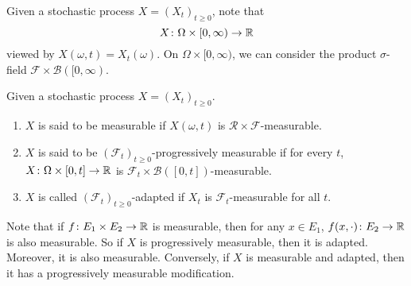 \noindent Given a stochastic process $X = (X_t)_{t \geq 0}$, note that 
\begin{equation*}
    X \colon \Omega \times [0,\infty) \rightarrow \mathbb{R}
\end{equation*}
viewed by $X(\omega,t) = X_t(\omega)$. On $\Omega \times [0,\infty)$, we can consider the product $\sigma$-field $\mathcal{F} \times \mathcal{B}([0,\infty)$.
\begin{defn}[Measurability]
    Given a stochastic process $X = (X_t)_{t \geq 0}$.
    \begin{enumerate}[label=(\arabic{*})]
        \item $X$ is said to be measurable if $X(\omega,t)$ is $\mathcal{R} \times \mathcal{F}$-measurable.
        \item $X$ is said to be $(\mathcal{F}_t)_{t \geq 0}$-progressively measurable if for every $t$, $X \colon \Omega \times [0,t] \rightarrow \mathbb{R}$ is  $\mathcal{F}_t \times \mathcal{B}([0,t])$-measurable.
        \item $X$ is called $(\mathcal{F}_t)_{t \geq 0}$-adapted if $X_t$ is $\mathcal{F}_t$-measurable for all $t$.
    \end{enumerate}
\end{defn}
\begin{rmk}
   Note that if $f \colon E_1 \times E_2 \rightarrow \mathbb{R}$ is measurable, then for any $x\in E_1$, $f(x,\cdot) \colon E_2 \rightarrow \mathbb{R}$ is also measurable. So if $X$ is progressively measurable, then it is adapted. Moreover, it is also measurable. Conversely, if $X$ is measurable and adapted, then it has a progressively measurable modification. 
\end{rmk}

